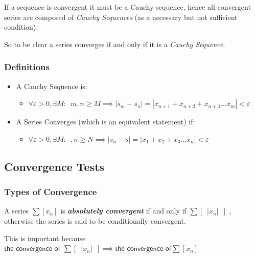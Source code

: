 \documentclass[class=article, crop=false]{standalone}
\begin{document}
If a sequence is convergent it must be a Cauchy sequence, hence all
convergent series are composed of \emph{Cauchy Sequences} (as a
necessary but not sufficient condition).

So to be clear a series converges if and only if it is a \emph{Cauchy
Sequence}.

\hypertarget{header-n3170}{%
\subsubsection{Definitions}\label{header-n3170}}

\begin{itemize}
\item
  A Cauchy Sequence is:

  \begin{itemize}
  \item
    \(\forall \varepsilon > 0, \exists M : \enspace m,n \geq M \implies \mid s_m -s_n \mid = \left| x_{n+1} + x_{n+2} + x_{n+3} \dots x_m \right| < \varepsilon\)
  \end{itemize}
\item
  A Series Converges (which is an equivalent statement) if:

  \begin{itemize}
  \item
    \(\forall \varepsilon > 0, \exists M : \enspace ,n \geq N \implies \mid s_n -s \mid = \left| x_{1} + x_{2} + x_{3} \dots x_n \right| < \varepsilon\)
  \end{itemize}
\end{itemize}


\newpage
\hypertarget{header-n3182}{%
\subsection{Convergence Tests}\label{header-n3182}}

\hypertarget{header-n3183}{%
\subsubsection{Types of Convergence}\label{header-n3183}}

A series \(\sum [x_n]\) is \textbf{\emph{absolutely convergent}} if and
only if \(\sum \left[  \enspace \left| x_n \right| \enspace \right]\) ,
otherwise the series is said to be conditionally convergent.

This is important because
\(\textsf{the convergence of } \sum \left[  \enspace \left| x_n \right| \enspace \right] \implies \textsf{the convergence of} \sum [x_n]\)
\end{document}
